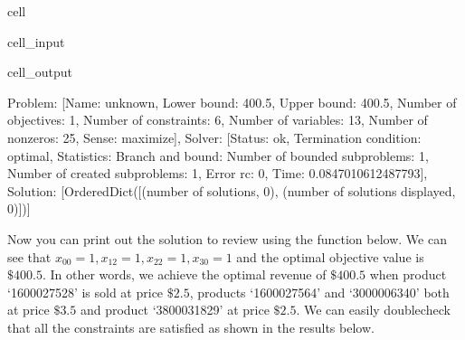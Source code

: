 \documentclass[letterpaper,10pt,english]{jupyterBook}
\begin{document}
\begin{sphinxuseclass}{cell}\begin{sphinxVerbatimInput}

\begin{sphinxuseclass}{cell_input}
\begin{sphinxVerbatim}[commandchars=\\\{\}]
  
\end{sphinxVerbatim}

\end{sphinxuseclass}\end{sphinxVerbatimInput}
\begin{sphinxVerbatimOutput}

\begin{sphinxuseclass}{cell_output}
\begin{sphinxVerbatim}[commandchars=\\\{\}]
\PYGZob{}\PYGZsq{}Problem\PYGZsq{}: [\PYGZob{}\PYGZsq{}Name\PYGZsq{}: \PYGZsq{}unknown\PYGZsq{}, \PYGZsq{}Lower bound\PYGZsq{}: 400.5, \PYGZsq{}Upper bound\PYGZsq{}: 400.5, \PYGZsq{}Number of objectives\PYGZsq{}: 1, \PYGZsq{}Number of constraints\PYGZsq{}: 6, \PYGZsq{}Number of variables\PYGZsq{}: 13, \PYGZsq{}Number of nonzeros\PYGZsq{}: 25, \PYGZsq{}Sense\PYGZsq{}: \PYGZsq{}maximize\PYGZsq{}\PYGZcb{}], \PYGZsq{}Solver\PYGZsq{}: [\PYGZob{}\PYGZsq{}Status\PYGZsq{}: \PYGZsq{}ok\PYGZsq{}, \PYGZsq{}Termination condition\PYGZsq{}: \PYGZsq{}optimal\PYGZsq{}, \PYGZsq{}Statistics\PYGZsq{}: \PYGZob{}\PYGZsq{}Branch and bound\PYGZsq{}: \PYGZob{}\PYGZsq{}Number of bounded subproblems\PYGZsq{}: \PYGZsq{}1\PYGZsq{}, \PYGZsq{}Number of created subproblems\PYGZsq{}: \PYGZsq{}1\PYGZsq{}\PYGZcb{}\PYGZcb{}, \PYGZsq{}Error rc\PYGZsq{}: 0, \PYGZsq{}Time\PYGZsq{}: 0.0847010612487793\PYGZcb{}], \PYGZsq{}Solution\PYGZsq{}: [OrderedDict([(\PYGZsq{}number of solutions\PYGZsq{}, 0), (\PYGZsq{}number of solutions displayed\PYGZsq{}, 0)])]\PYGZcb{}
\end{sphinxVerbatim}

\end{sphinxuseclass}\end{sphinxVerbatimOutput}

\end{sphinxuseclass}
\sphinxAtStartPar
Now you can print out the solution to review using the function  below. We can see that \(x_{00} = 1, x_{12} = 1, x_{22} = 1, x_{30} = 1\) and the optimal objective value is \(\$400.5\). In other words, we achieve the optimal revenue of \(\$400.5\) when product ‘1600027528’ is sold at price \(\$2.5\), products ‘1600027564’ and ‘3000006340’ both  at price \(\$3.5\) and product ‘3800031829’ at price \(\$2.5\). We can easily double\sphinxhyphen{}check that all the constraints are satisfied as shown in the results below.
\end{document}
